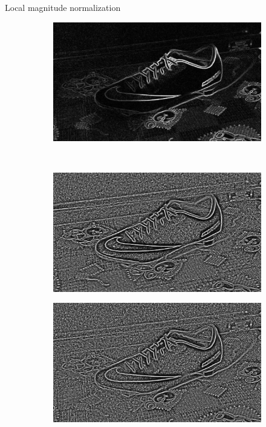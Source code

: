 \documentclass[14pt,t]{beamer}
\begin{document}
\begin{frame}{Local magnitude normalization}
\begin{figure}[p]
\begin{subfigure}[t]{0.4\textwidth}
	\end{subfigure}
	\hspace{0.5cm}
	\begin{subfigure}[t]{0.4\textwidth}
		\includegraphics[width=\textwidth]{img/pixelNormalizationExample4.png}
	\end{subfigure}\\
	\vspace{0.75mm}
	\begin{subfigure}[t]{0.4\textwidth}
		\includegraphics[width=\textwidth]{img/pixelNormalizationExample5.png}
	\end{subfigure}
	\hspace{0.5cm}
	\begin{subfigure}[t]{0.4\textwidth}
		\includegraphics[width=\textwidth]{img/pixelNormalizationExample6.png}
	\end{subfigure}
\end{figure}
\end{frame}
\end{document}
